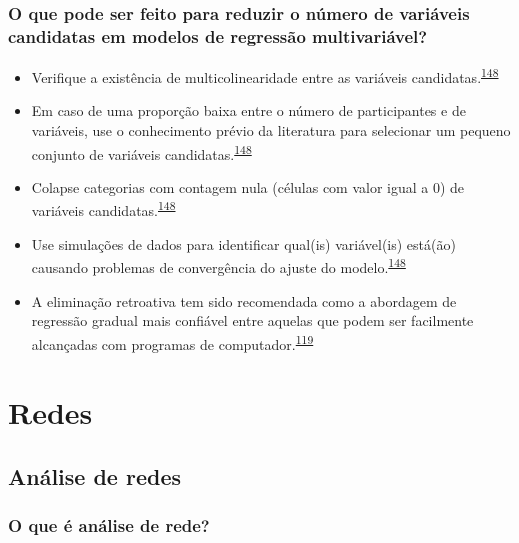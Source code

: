 \documentclass[
  a4paper,
]{book}
\begin{document}
\hypertarget{o-que-pode-ser-feito-para-reduzir-o-nuxfamero-de-variuxe1veis-candidatas-em-modelos-de-regressuxe3o-multivariuxe1vel}{%
\subsection{O que pode ser feito para reduzir o número de variáveis candidatas em modelos de regressão multivariável?}\label{o-que-pode-ser-feito-para-reduzir-o-nuxfamero-de-variuxe1veis-candidatas-em-modelos-de-regressuxe3o-multivariuxe1vel}}

\begin{itemize}
\item
  Verifique a existência de multicolinearidade entre as variáveis candidatas.\textsuperscript{\protect\hyperlink{ref-Sun1996}{148}}
\item
  Em caso de uma proporção baixa entre o número de participantes e de variáveis, use o conhecimento prévio da literatura para selecionar um pequeno conjunto de variáveis candidatas.\textsuperscript{\protect\hyperlink{ref-Sun1996}{148}}
\item
  Colapse categorias com contagem nula (células com valor igual a 0) de variáveis candidatas.\textsuperscript{\protect\hyperlink{ref-Sun1996}{148}}
\item
  Use simulações de dados para identificar qual(is) variável(is) está(ão) causando problemas de convergência do ajuste do modelo.\textsuperscript{\protect\hyperlink{ref-Sun1996}{148}}
\item
  A eliminação retroativa tem sido recomendada como a abordagem de regressão gradual mais confiável entre aquelas que podem ser facilmente alcançadas com programas de computador.\textsuperscript{\protect\hyperlink{ref-heinze2016}{119}}
\end{itemize}

\hypertarget{analise-redes}{%
\chapter{\texorpdfstring{\textbf{Redes}}{Redes}}\label{analise-redes}}

\hypertarget{redes}{%
\section{Análise de redes}\label{redes}}

\hypertarget{o-que-uxe9-anuxe1lise-de-rede}{%
\subsection{O que é análise de rede?}\label{o-que-uxe9-anuxe1lise-de-rede}}
\end{document}
